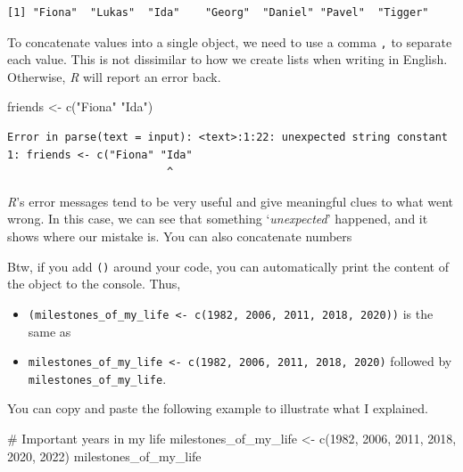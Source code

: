 \documentclass[
  letterpaper,
]{krantz}
\makeatletter
\newenvironment{Shaded}{\begin{snugshade}}{\end{snugshade}}
\newcommand{\CommentTok}[1]{\textcolor[rgb]{0.37,0.37,0.37}{#1}}
\newcommand{\DecValTok}[1]{\textcolor[rgb]{0.68,0.00,0.00}{#1}}
\newcommand{\FunctionTok}[1]{\textcolor[rgb]{0.28,0.35,0.67}{#1}}
\newcommand{\NormalTok}[1]{\textcolor[rgb]{0.00,0.23,0.31}{#1}}
\newcommand{\OtherTok}[1]{\textcolor[rgb]{0.00,0.23,0.31}{#1}}
\newcommand{\StringTok}[1]{\textcolor[rgb]{0.13,0.47,0.30}{#1}}
\newenvironment{kframe}{%
\medskip{}
\setlength{\fboxsep}{.8em}
 \def\at@end@of@kframe{}%
 \ifinner\ifhmode%
  \def\at@end@of@kframe{\end{minipage}}%
  \begin{minipage}{\columnwidth}%
 \fi\fi%
 \def\FrameCommand##1{\hskip\@totalleftmargin \hskip-\fboxsep
 \colorbox{shadecolor}{##1}\hskip-\fboxsep
     \hskip-\linewidth \hskip-\@totalleftmargin \hskip\columnwidth}%
 \MakeFramed {\advance\hsize-\width
   \@totalleftmargin\z@ \linewidth\hsize
   \@setminipage}}%
 {\par\unskip\endMakeFramed%
 \at@end@of@kframe}
\renewenvironment{Shaded}{\begin{kframe}}{\end{kframe}}
\makeatother
\begin{document}
\begin{verbatim}
[1] "Fiona"  "Lukas"  "Ida"    "Georg"  "Daniel" "Pavel"  "Tigger"
\end{verbatim}

To concatenate values into a single object, we need to use a comma
\texttt{,} to separate each value. This is not dissimilar to how we
create lists when writing in English. Otherwise, \emph{R} will report an
error back.

\begin{Shaded}
\begin{Highlighting}[]
\NormalTok{friends }\OtherTok{\textless{}{-}} \FunctionTok{c}\NormalTok{(}\StringTok{"Fiona"} \StringTok{"Ida"}\NormalTok{)}
\end{Highlighting}
\end{Shaded}

\begin{verbatim}
Error in parse(text = input): <text>:1:22: unexpected string constant
1: friends <- c("Fiona" "Ida"
                         ^
\end{verbatim}

\emph{R}'s error messages tend to be very useful and give meaningful
clues to what went wrong. In this case, we can see that something
`\emph{unexpected}' happened, and it shows where our mistake is. You can
also concatenate numbers

Btw, if you add \texttt{()} around your code, you can automatically
print the content of the object to the console. Thus,

\begin{itemize}
\item
  \texttt{(milestones\_of\_my\_life\ \textless{}-\ c(1982,\ 2006,\ 2011,\ 2018,\ 2020))}
  is the same as
\item
  \texttt{milestones\_of\_my\_life\ \textless{}-\ c(1982,\ 2006,\ 2011,\ 2018,\ 2020)}
  followed by \texttt{milestones\_of\_my\_life}.
\end{itemize}

You can copy and paste the following example to illustrate what I
explained.

\begin{Shaded}
\begin{Highlighting}[]
\CommentTok{\# Important years in my life}
\NormalTok{milestones\_of\_my\_life }\OtherTok{\textless{}{-}} \FunctionTok{c}\NormalTok{(}\DecValTok{1982}\NormalTok{, }\DecValTok{2006}\NormalTok{, }\DecValTok{2011}\NormalTok{, }\DecValTok{2018}\NormalTok{, }\DecValTok{2020}\NormalTok{, }\DecValTok{2022}\NormalTok{)}
\NormalTok{milestones\_of\_my\_life}
\end{Highlighting}
\end{Shaded}
\end{document}
